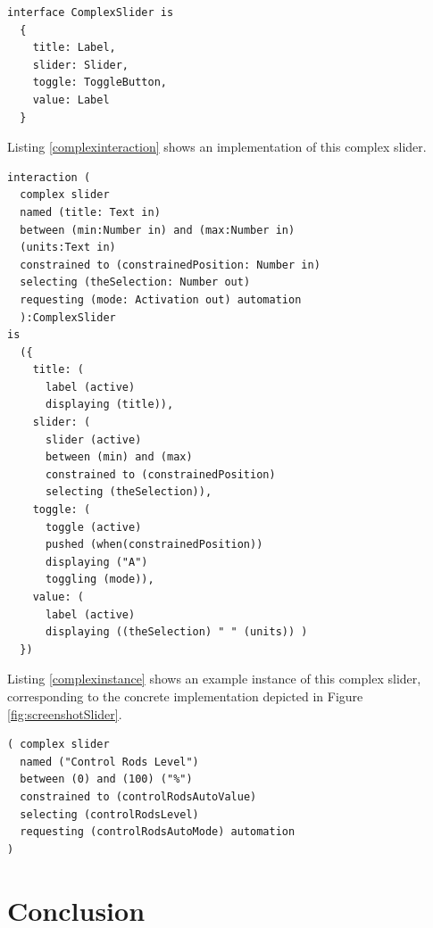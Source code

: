 \documentclass[10pt]{sigplanconf}
\begin{document}
\begin{lstlisting}[caption=The interface of the complex slider,label=complexinterface]
interface ComplexSlider is
  {
    title: Label,
    slider: Slider,
    toggle: ToggleButton,
    value: Label
  }
\end{lstlisting}

Listing \ref{complexinteraction} shows an implementation of this complex slider. 

\begin{lstlisting}[caption=Definition of a complex slider interaction,label=complexinteraction]
interaction ( 
  complex slider
  named (title: Text in)
  between (min:Number in) and (max:Number in) 
  (units:Text in)
  constrained to (constrainedPosition: Number in)
  selecting (theSelection: Number out)
  requesting (mode: Activation out) automation
  ):ComplexSlider
is
  ({
    title: (
      label (active) 
      displaying (title)),
    slider: (
      slider (active) 
      between (min) and (max) 
      constrained to (constrainedPosition)
      selecting (theSelection)),
    toggle: ( 
      toggle (active) 
      pushed (when(constrainedPosition)) 
      displaying ("A") 
      toggling (mode)),
    value: (
      label (active) 
      displaying ((theSelection) " " (units)) )
  })
\end{lstlisting}

Listing \ref{complexinstance} shows an example instance of this complex slider, corresponding to the concrete implementation depicted in Figure \ref{fig:screenshotSlider}.

\begin{lstlisting}[caption=An instance of the complex slider interaction,label=complexinstance]
( complex slider
  named ("Control Rods Level")
  between (0) and (100) ("%")
  constrained to (controlRodsAutoValue)
  selecting (controlRodsLevel)
  requesting (controlRodsAutoMode) automation
)
\end{lstlisting}

\section{Conclusion}
\end{document}
